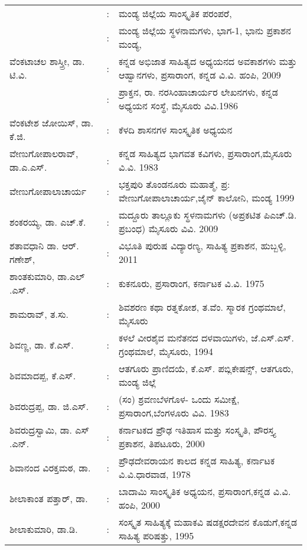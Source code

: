 \begin{longtable}[l]{@{}>{\raggedright}p{4.7cm}cp{9.2cm}<{\raggedright}@{}}
& : & ಮಂಡ್ಯ ಜಿಲ್ಲೆಯ ಸಾಂಸ್ಕೃತಿಕ ಪರಂಪರೆ,\\
& : & ಮಂಡ್ಯ ಜಿಲ್ಲೆಯ ಸ್ಥಳನಾಮಗಳು, ಭಾಗ-1, ಭಾನು ಪ್ರಕಾಶನ ಮಂಡ್ಯ,\\
ವೆಂಕಟಾಚಲ ಶಾಸ್ತ್ರೀ, ಡಾ. ಟಿ.ವಿ. & : & ಕನ್ನಡ ಅಭಿಜಾತ ಸಾಹಿತ್ಯದ ಅಧ್ಯಯನದ ಅವಕಾಶಗಳು ಮತ್ತು ಆಹ್ವಾನಗಳು, ಪ್ರಸಾರಾಂಗ, ಕನ್ನಡ ವಿ.ವಿ. ಹಂಪಿ, 2009\\
& : & ಪ್ರಾಕ್ತನ, ರಾ. ನರಸಿಂಹಾಚಾರ್ಯರ ಲೇಖನಗಳು, ಕನ್ನಡ ಅಧ್ಯಯನ ಸಂಸ್ಥೆ, ಮೈಸೂರು ವಿವಿ.1986\\
ವೆಂಕಟೇಶ ಜೋಯಿಸ್​, ಡಾ. ಕೆ.ಜಿ. & : & ಕೆಳದಿ ಶಾಸನಗಳ ಸಾಂಸ್ಕೃತಿಕ ಅಧ್ಯಯನ\\
ವೇಣುಗೋಪಾಲರಾವ್​, ಡಾ.ಎ.ಎಸ್​. & : & ಕನ್ನಡ ಸಾಹಿತ್ಯದ ಭಾಗವತ ಕವಿಗಳು, ಪ್ರಸಾರಾಂಗ,\newline ಮೈಸೂರು ವಿ.ವಿ. 1983\\
ವೇಣುಗೋಪಾಲಾಚಾರ್ಯ & : & ಭಕ್ತಪುರಿ ತೊಂಡನೂರು ಮಹಾತ್ಮೆ, ಪ್ರ: ವೇಣುಗೋಪಾಲಾಚಾರ್ಯ,\newline ಜೈನ್​ ಕಾಲೋನಿ, ಮಂಡ್ಯ 1999\\
ಶಂಕರಯ್ಯ, ಡಾ. ಎಚ್​.ಕೆ. & : & ಮದ್ದೂರು ತಾಲ್ಲೂಕು ಸ್ಥಳನಾಮಗಳು (ಅಪ್ರಕಟಿತ ಪಿಎಚ್​.ಡಿ. ಪ್ರಬಂಧ) ಮೈಸೂರು ವಿವಿ. 2009\\
ಶತಾವಧಾನಿ ಡಾ. ಆರ್​. ಗಣೇಶ್​, & : & ವಿಭೂತಿ ಪುರುಷ ವಿದ್ಯಾರಣ್ಯ, ಸಾಹಿತ್ಯ ಪ್ರಕಾಶನ, ಹುಬ್ಬಳ್ಳಿ, 2011\\
ಶಾಂತಕುಮಾರಿ, ಡಾ.ಎಲ್​.ಎಸ್​. & : & ಕುಕನೂರು, ಪ್ರಸಾರಾಂಗ, ಕರ್ನಾಟಕ ವಿ.ವಿ. 1975\\
ಶಾಮರಾವ್​, ತ.ಸು. & : & ಶಿವಶರಣ ಕಥಾ ರತ್ನಕೋಶ, ತ.ವೆಂ. ಸ್ಮಾರಕ ಗ್ರಂಥಮಾಲೆ, ಮೈಸೂರು\\
ಶಿವಣ್ಣ, ಡಾ. ಕೆ.ಎಸ್​. & : &  ಕಳಲೆ ವೀರಶೈವ ಮನೆತನದ ದಳವಾಯಿಗಳು, ಜೆ.ಎಸ್​.ಎಸ್​. ಗ್ರಂಥಮಾಲೆ, ಮೈಸೂರು, 1994\\
ಶಿವಮಾದಪ್ಪ, ಕೆ.ಎಸ್​. & : & ಆತಗೂರು ಪ್ರಾಣಿದಯೆ, ಕೆ.ಎಸ್​. ಪಬ್ಲಿಕೇಷನ್ಸ್​, ಆತಗೂರು, ಮಂಡ್ಯ ಜಿಲ್ಲೆ\\
ಶಿವರುದ್ರಪ್ಪ, ಡಾ. ಜಿ.ಎಸ್​. & : &  (ಸಂ) ಶ್ರವಣಬೆಳಗೊಳ- ಒಂದು ಸಮೀಕ್ಷೆ, ಪ್ರಸಾರಾಂಗ,\newline ಬೆಂಗಳೂರು ವಿವಿ. 1983\\
ಶಿವರುದ್ರಸ್ವಾಮಿ, ಡಾ. ಎಸ್​.ಎನ್​. & : & ಕರ್ನಾಟಕದ ಪ್ರೌಢ ಇತಿಹಾಸ ಮತ್ತು ಸಂಸ್ಕೃತಿ, ಪೌರಸ್ತ್ಯ ಪ್ರಕಾಶನ, ತಿಪಟೂರು, 2000\\
ಶಿವಾನಂದ ವಿರಕ್ತಮಠ, ಡಾ. & : &  ಪ್ರೌಢದೇವರಾಯನ ಕಾಲದ ಕನ್ನಡ ಸಾಹಿತ್ಯ, ಕರ್ನಾಟಕ ವಿ.ವಿ.\newline ಧಾರವಾಡ, 1978\\
ಶೀಲಾಕಾಂತ ಪತ್ತಾರ್​, ಡಾ. & : &  ಬಾದಾಮಿ ಸಾಂಸ್ಕೃತಿಕ ಅಧ್ಯಯನ, ಪ್ರಸಾರಾಂಗ,\newline ಕನ್ನಡ ವಿ.ವಿ. ಹಂಪಿ, 2000\\
ಶೀಲಾಕುಮಾರಿ, ಡಾ.ಡಿ. & : &  ಸಂಸ್ಕೃತ ಸಾಹಿತ್ಯಕ್ಕೆ ಮಹಾಕವಿ ಷಡಕ್ಷರದೇವನ ಕೊಡುಗೆ,\newline ಕನ್ನಡ ಸಾಹಿತ್ಯ ಪರಿಷತ್ತು, 1995\\

\end{longtable}
